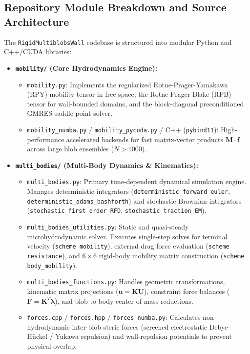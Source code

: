 \documentclass[11pt,a4paper]{article}
\begin{document}
\subsection{Repository Module Breakdown and Source Architecture}
The \texttt{RigidMultiblobsWall} codebase is structured into modular Python and C++/CUDA libraries:
\begin{itemize}
    \item \textbf{\texttt{mobility/} (Core Hydrodynamics Engine):}
    \begin{itemize}
        \item \texttt{mobility.py}: Implements the regularized Rotne-Prager-Yamakawa (RPY) mobility tensor in free space, the Rotne-Prager-Blake (RPB) tensor for wall-bounded domains, and the block-diagonal preconditioned GMRES saddle-point solver.
        \item \texttt{mobility\_numba.py} / \texttt{mobility\_pycuda.py} / C++ (\texttt{pybind11}): High-performance accelerated backends for fast matrix-vector products $\mathbf{M} \cdot \mathbf{f}$ across large blob ensembles ($N > 1000$).
    \end{itemize}
    \item \textbf{\texttt{multi\_bodies/} (Multi-Body Dynamics \& Kinematics):}
    \begin{itemize}
        \item \texttt{multi\_bodies.py}: Primary time-dependent dynamical simulation engine. Manages deterministic integrators (\texttt{deterministic\_forward\_euler}, \texttt{deterministic\_adams\_bashforth}) and stochastic Brownian integrators (\texttt{stochastic\_first\_order\_RFD}, \texttt{stochastic\_traction\_EM}).
        \item \texttt{multi\_bodies\_utilities.py}: Static and quasi-steady microhydrodynamic solver. Executes single-step solves for terminal velocity (\texttt{scheme mobility}), external drag force evaluation (\texttt{scheme resistance}), and $6 \times 6$ rigid-body mobility matrix construction (\texttt{scheme body\_mobility}).
        \item \texttt{multi\_bodies\_functions.py}: Handles geometric transformations, kinematic matrix projections ($\mathbf{u} = \mathbf{K}\mathbf{U}$), constraint force balances ($\mathbf{F} = \mathbf{K}^T \boldsymbol{\lambda}$), and blob-to-body center of mass reductions.
        \item \texttt{forces.cpp} / \texttt{forces.hpp} / \texttt{forces\_numba.py}: Calculates non-hydrodynamic inter-blob steric forces (screened electrostatic Debye-Hückel / Yukawa repulsion) and wall-repulsion potentials to prevent physical overlap.

\end{itemize}
\end{itemize}
\end{document}
